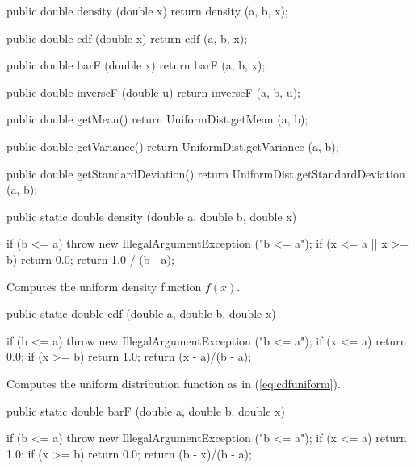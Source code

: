 \begin{code}\begin{hide}

   public double density (double x) {
      return density (a, b, x);
   }
       
   public double cdf (double x) {
      return cdf (a, b, x);
   }
 
   public double barF (double x) {
      return barF (a, b, x);
   }
     
   public double inverseF (double u) {
      return inverseF (a, b, u);
   }

   public double getMean() {
      return UniformDist.getMean (a, b);
   }

   public double getVariance() {
      return UniformDist.getVariance (a, b);
   }

   public double getStandardDeviation() {
      return UniformDist.getStandardDeviation (a, b);
   }\end{hide}

   public static double density (double a, double b, double x)\begin{hide} {
      if (b <= a)
         throw new IllegalArgumentException ("b <= a");
      if (x <= a || x >= b)
         return 0.0;
      return 1.0 / (b - a);
   }\end{hide}
\end{code}
\begin{tabb} Computes the uniform density function 
 $f(x)$.
\end{tabb}
\begin{code}

   public static double cdf (double a, double b, double x)\begin{hide} {
      if (b <= a)
        throw new IllegalArgumentException ("b <= a");
      if (x <= a)
         return 0.0;
      if (x >= b)
         return 1.0;
      return (x - a)/(b - a);
   }\end{hide}
\end{code}
 \begin{tabb}
  Computes the uniform distribution function as in (\ref{eq:cdfuniform}).
 \end{tabb}
\begin{code}

   public static double barF (double a, double b, double x)\begin{hide} {
      if (b <= a)
        throw new IllegalArgumentException ("b <= a");
      if (x <= a)
         return 1.0;
      if (x >= b)
         return 0.0;
      return (b - x)/(b - a);
   }\end{hide}
\end{code}

